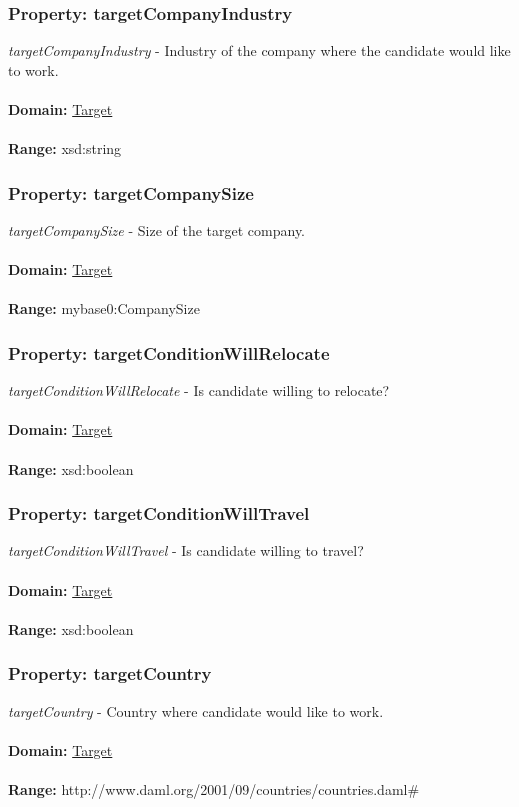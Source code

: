 \documentclass[a4paper,12pt]{article}
\numberwithin{equation}{section}
\begin{document}
\subsubsection{Property: targetCompanyIndustry}\hypertarget{targetCompanyIndustry}{}
\textit{targetCompanyIndustry} - Industry of the company where the candidate would like to work.
\\\\
\textbf{Domain:} \hyperlink{Target}{Target} 
\\\\
\textbf{Range:}  xsd:string 

\subsubsection{Property: targetCompanySize}\hypertarget{targetCompanySize}{}
\textit{targetCompanySize} - Size of the target company.
\\\\
\textbf{Domain:} \hyperlink{Target}{Target} 
\\\\
\textbf{Range:}  mybase0:CompanySize

\subsubsection{Property: targetConditionWillRelocate}\hypertarget{targetConditionWillRelocate}{}
\textit{targetConditionWillRelocate} - Is candidate willing to relocate?
\\\\
\textbf{Domain:} \hyperlink{Target}{Target} 
\\\\
\textbf{Range:}  xsd:boolean

\subsubsection{Property: targetConditionWillTravel}\hypertarget{targetConditionWillTravel}{}
\textit{targetConditionWillTravel} - Is candidate willing to travel?
\\\\
\textbf{Domain:} \hyperlink{Target}{Target} 
\\\\
\textbf{Range:}  xsd:boolean

\subsubsection{Property: targetCountry}\hypertarget{targetCountry}{}
\textit{targetCountry} - Country where candidate would like to work.
\\\\
\textbf{Domain:} \hyperlink{Target}{Target} 
\\\\
\textbf{Range:}  http://www.daml.org/2001/09/countries/countries.daml\#
\end{document}
